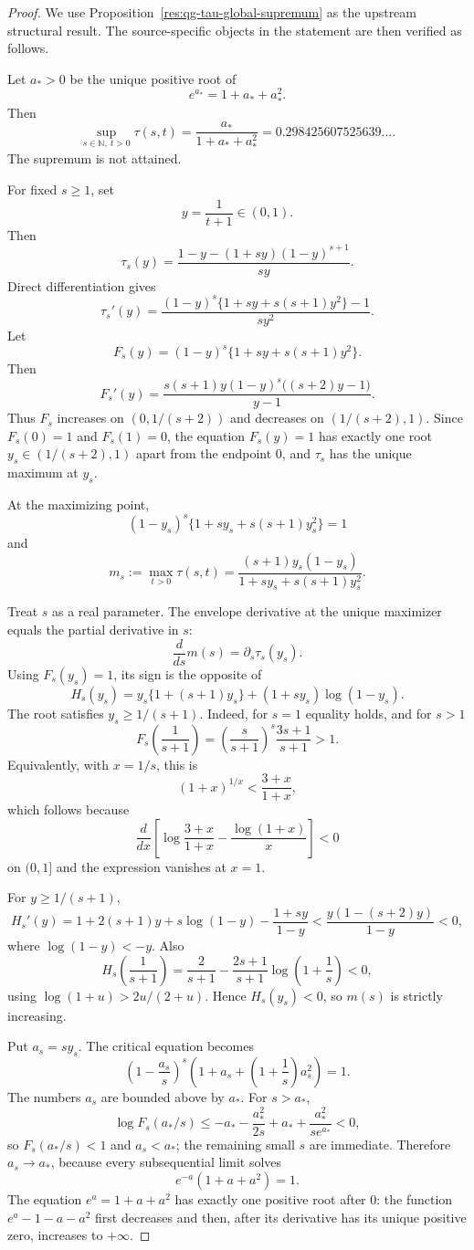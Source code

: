 \documentclass[11pt]{article}
\numberwithin{equation}{section}
\theoremstyle{definition}
\theoremstyle{remark}
\newcommand{\1}{\mathbf 1}
\begin{document}
\begin{proof}
We use Proposition~\ref{res:qg-tau-global-supremum} as the upstream structural result. The source-specific objects in the statement are then verified as follows.

Let \(a_*>0\) be the unique positive root of
\[
e^{a_*}=1+a_*+a_*^2.
\]
Then
\[
\sup_{s\in\mathbb N,\ t>0}\tau(s,t)
=\frac{a_*}{1+a_*+a_*^2}
=0.298425607525639\ldots.
\]
The supremum is not attained.

For fixed \(s\ge1\), set
\[
y=\frac1{t+1}\in(0,1).
\]
Then
\[
\tau_s(y)=\frac{1-y-(1+sy)(1-y)^{s+1}}{sy}.
\]
Direct differentiation gives
\[
\tau_s'(y)=
\frac{(1-y)^s\{1+sy+s(s+1)y^2\}-1}{s y^2}.
\]
Let
\[
F_s(y)=(1-y)^s\{1+sy+s(s+1)y^2\}.
\]
Then
\[
F_s'(y)=
\frac{s(s+1)y(1-y)^s\bigl((s+2)y-1\bigr)}{y-1}.
\]
Thus \(F_s\) increases on \((0,1/(s+2))\) and decreases on \((1/(s+2),1)\). Since \(F_s(0)=1\) and \(F_s(1)=0\), the equation \(F_s(y)=1\) has exactly one root \(y_s\in(1/(s+2),1)\) apart from the endpoint \(0\), and \(\tau_s\) has the unique maximum at \(y_s\).

At the maximizing point,
\[
(1-y_s)^s\{1+s y_s+s(s+1)y_s^2\}=1
\]
and
\[
m_s:=\max_{t>0}\tau(s,t)
=\frac{(s+1)y_s(1-y_s)}{1+s y_s+s(s+1)y_s^2}.
\]

Treat \(s\) as a real parameter. The envelope derivative at the unique maximizer equals the partial derivative in \(s\):
\[
\frac{d}{ds}m(s)=\partial_s\tau_s(y_s).
\]
Using \(F_s(y_s)=1\), its sign is the opposite of
\[
H_s(y_s)
=y_s\{1+(s+1)y_s\}+(1+s y_s)\log(1-y_s).
\]
The root satisfies \(y_s\ge1/(s+1)\). Indeed, for \(s=1\) equality holds, and for \(s>1\)
\[
F_s\!\left(\frac1{s+1}\right)
=\left(\frac{s}{s+1}\right)^s\frac{3s+1}{s+1}>1.
\]
Equivalently, with \(x=1/s\), this is
\[
(1+x)^{1/x}<\frac{3+x}{1+x},
\]
which follows because
\[
\frac{d}{dx}\left[\log\frac{3+x}{1+x}-\frac{\log(1+x)}x\right]<0
\]
on \((0,1]\) and the expression vanishes at \(x=1\).

For \(y\ge1/(s+1)\),
\[
H_s'(y)
=1+2(s+1)y+s\log(1-y)-\frac{1+sy}{1-y}
<\frac{y(1-(s+2)y)}{1-y}<0,
\]
where \(\log(1-y)<-y\). Also
\[
H_s\!\left(\frac1{s+1}\right)
=\frac2{s+1}-\frac{2s+1}{s+1}\log\left(1+\frac1s\right)<0,
\]
using \(\log(1+u)>2u/(2+u)\). Hence \(H_s(y_s)<0\), so \(m(s)\) is strictly increasing.

Put \(a_s=s y_s\). The critical equation becomes
\[
\left(1-\frac{a_s}{s}\right)^s
\left(1+a_s+\left(1+\frac1s\right)a_s^2\right)=1.
\]
The numbers \(a_s\) are bounded above by \(a_*\). For \(s>a_*\),
\[
\log F_s(a_*/s)
\le -a_*-\frac{a_*^2}{2s}
  +a_*+\frac{a_*^2}{s e^{a_*}}<0,
\]
so \(F_s(a_*/s)<1\) and \(a_s<a_*\); the remaining small \(s\) are immediate. Therefore \(a_s\to a_*\), because every subsequential limit solves
\[
e^{-a}(1+a+a^2)=1.
\]
The equation \(e^a=1+a+a^2\) has exactly one positive root after \(0\): the function \(e^a-1-a-a^2\) first decreases and then, after its derivative has its unique positive zero, increases to \(+\infty\).


\end{proof}
\end{document}
